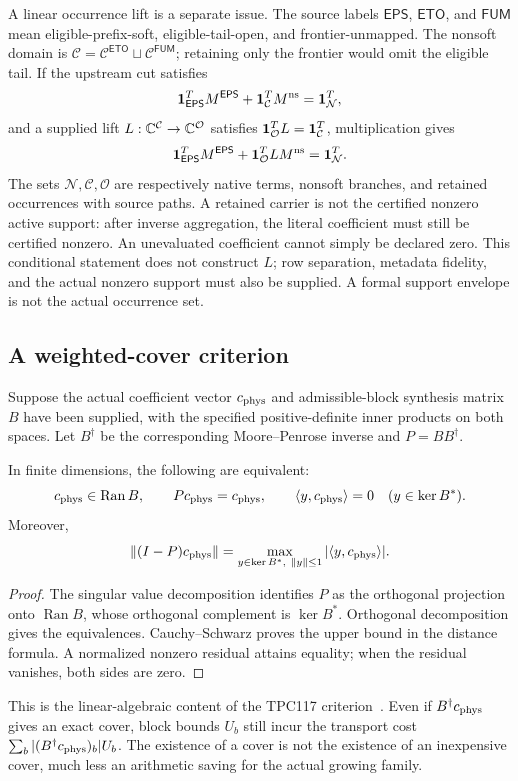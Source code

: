 A linear occurrence lift is a separate issue. The source labels $\mathsf{EPS}$, $\mathsf{ETO}$, and $\mathsf{FUM}$ mean eligible-prefix-soft, eligible-tail-open, and frontier-unmapped. The nonsoft domain is
$\mathcal C=\mathcal C^{\mathsf{ETO}}\sqcup\mathcal C^{\mathsf{FUM}}$; retaining only the frontier would omit the eligible tail. If the upstream cut satisfies
\[
\mathbf 1_{\mathsf{EPS}}^TM^{\mathsf{EPS}}+\mathbf 1_{\mathcal C}^TM^{\rm ns}=\mathbf 1_{\mathcal N}^T,
\]
and a supplied lift $L:\mathbb C^{\mathcal C}\to\mathbb C^{\mathcal O}$ satisfies $\mathbf 1_{\mathcal O}^TL=\mathbf 1_{\mathcal C}^T$, multiplication gives
\[
\mathbf 1_{\mathsf{EPS}}^TM^{\mathsf{EPS}}+\mathbf 1_{\mathcal O}^TLM^{\rm ns}=\mathbf 1_{\mathcal N}^T.
\]
The sets $\mathcal N,\mathcal C,\mathcal O$ are respectively native terms, nonsoft branches, and retained occurrences with source paths. A retained carrier is not the certified nonzero active support: after inverse aggregation, the literal coefficient must still be certified nonzero. An unevaluated coefficient cannot simply be declared zero. This conditional statement does not construct $L$; row separation, metadata fidelity, and the actual nonzero support must also be supplied. A formal support envelope is not the actual occurrence set.

\subsection{A weighted-cover criterion}
Suppose the actual coefficient vector $c_{\rm phys}$ and admissible-block synthesis matrix $B$ have been supplied, with the specified positive-definite inner products on both spaces. Let $B^\dagger$ be the corresponding Moore--Penrose inverse and $P=BB^\dagger$.
\begin{proposition}
In finite dimensions, the following are equivalent:
\[
c_{\rm phys}\in\operatorname{Ran}B,\qquad Pc_{\rm phys}=c_{\rm phys},\qquad
\langle y,c_{\rm phys}\rangle=0\quad(y\in\ker B^*).
\]
Moreover,
\[
\|(I-P)c_{\rm phys}\|=
\max_{y\in\ker B^*,\ \|y\|\le1}|\langle y,c_{\rm phys}\rangle|.
\]
\end{proposition}
\begin{proof}
The singular value decomposition identifies $P$ as the orthogonal projection onto $\operatorname{Ran}B$, whose orthogonal complement is $\ker B^*$. Orthogonal decomposition gives the equivalences. Cauchy--Schwarz proves the upper bound in the distance formula. A normalized nonzero residual attains equality; when the residual vanishes, both sides are zero.
\end{proof}
This is the linear-algebraic content of the TPC117 criterion~\cite{archivestructure}. Even if $B^\dagger c_{\rm phys}$ gives an exact cover, block bounds $U_b$ still incur the transport cost
$\sum_b|(B^\dagger c_{\rm phys})_b|U_b$.
The existence of a cover is not the existence of an inexpensive cover, much less an arithmetic saving for the actual growing family.

